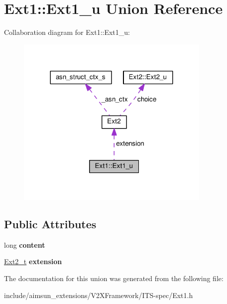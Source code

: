 \hypertarget{unionExt1_1_1Ext1__u}{}\section{Ext1\+:\+:Ext1\+\_\+u Union Reference}
\label{unionExt1_1_1Ext1__u}


Collaboration diagram for Ext1\+:\+:Ext1\+\_\+u\+:\nopagebreak
\begin{figure}[H]
\begin{center}
\leavevmode
\includegraphics[width=264pt]{unionExt1_1_1Ext1__u__coll__graph}
\end{center}
\end{figure}
\subsection*{Public Attributes}
\begin{DoxyCompactItemize}
\item 
long {\bfseries content}\hypertarget{unionExt1_1_1Ext1__u_af6a41dd5841d29834fc6d89ec851f7de}{}\label{unionExt1_1_1Ext1__u_af6a41dd5841d29834fc6d89ec851f7de}

\item 
\hyperlink{structExt2}{Ext2\+\_\+t} {\bfseries extension}\hypertarget{unionExt1_1_1Ext1__u_aa17db690621bc9eeb3bcd3937053c32a}{}\label{unionExt1_1_1Ext1__u_aa17db690621bc9eeb3bcd3937053c32a}

\end{DoxyCompactItemize}


The documentation for this union was generated from the following file\+:\begin{DoxyCompactItemize}
\item 
include/aimsun\+\_\+extensions/\+V2\+X\+Framework/\+I\+T\+S-\/spec/Ext1.\+h\end{DoxyCompactItemize}
